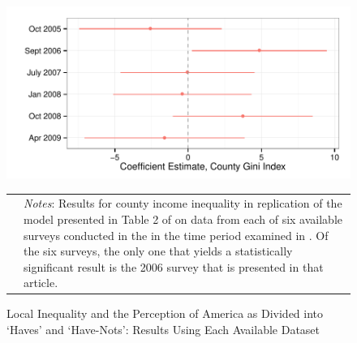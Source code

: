 \begin{figure}[htbp] 
  \caption{Local Inequality and the Perception of America as Divided into `Haves' and `Have-Nots': Results Using Each Available Dataset}
  \label{F:coef.t1m1}
  \begin{center}
    \includegraphics[width=5.25in]{../figures/03_examine_all_available_data_t2_by_survey.pdf}
  \end{center}
  \begin{footnotesize}
  \begin{tabular}{p{.1in} p{5.1in}}
  & \emph{Notes}: Results for county income inequality in replication of the model presented in Table 2 of \citet{Newman2015} on data from each of six available surveys conducted in the in the time period examined in \citet{Newman2015}.  Of the six surveys, the only one that yields a statistically significant result is the 2006 survey that is presented in that article.
  \end{tabular}
  \end{footnotesize}
\end{figure}



